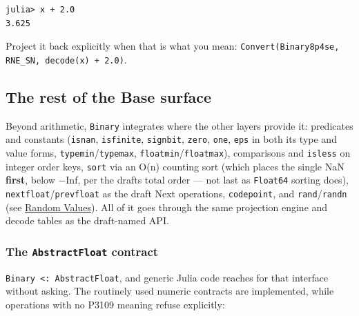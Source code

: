 \begin{verbatim}
julia> x + 2.0
3.625
\end{verbatim}



Project it back explicitly when that is what you mean: \texttt{Convert(\allowbreak{}Binary8p4se, RNE\_\allowbreak{}SN, decode(\allowbreak{}x) + 2.0)}.



\subsection{The rest of the Base surface}



\label{15708086746009923714}{}


Beyond arithmetic, \texttt{Binary} integrates where the other layers provide it: predicates and constants (\texttt{isnan}, \texttt{isfinite}, \texttt{signbit}, \texttt{zero}, \texttt{one}, \texttt{eps} in both its type and value forms, \texttt{typemin}/\allowbreak\texttt{typemax}, \texttt{floatmin}/\allowbreak\texttt{floatmax}), comparisons and \texttt{isless} on integer order keys, \texttt{sort} via an O(n) counting sort (which places the single NaN \textbf{first}, below −Inf, per the draft{\textquotesingle}s total order — not last as \texttt{Float64} sorting does), \texttt{nextfloat}/\allowbreak\texttt{prevfloat} as the draft Next operations, \texttt{codepoint}, and \texttt{rand}/\allowbreak\texttt{randn} (see \href{concept\_\allowbreak{}session\_\allowbreak{}state.md}{Random Values}). All of it goes through the same projection engine and decode tables as the draft-named API.



\subsubsection{The \texttt{AbstractFloat} contract}



\label{17934115691166927451}{}


\texttt{Binary <: AbstractFloat}, and generic Julia code reaches for that interface without asking. The routinely used numeric contracts are implemented, while operations with no P3109 meaning refuse explicitly:




